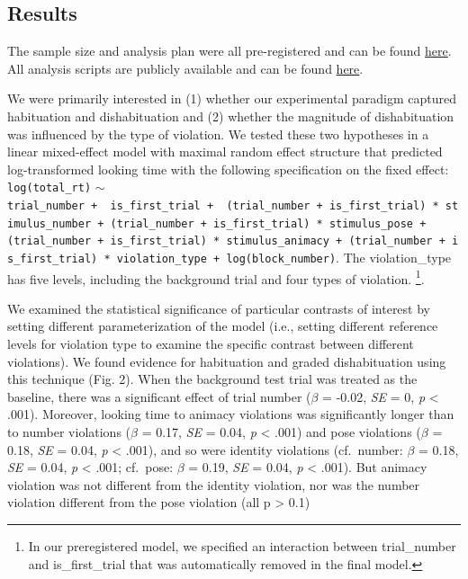 \documentclass[10pt, letterpaper]{article}
\begin{document}
\hypertarget{results}{%
\subsection{Results}\label{results}}

The sample size and analysis plan were all pre-registered and can be
found \href{https://aspredicted.org/blind.php?x=WGF_J7K}{here}. All
analysis scripts are publicly available and can be found
\href{https://anonymous.4open.science/r/pokebaby_cogsci2024-3636/README.md}{here}.

We were primarily interested in (1) whether our experimental paradigm
captured habituation and dishabituation and (2) whether the magnitude of
dishabituation was influenced by the type of violation. We tested these
two hypotheses in a linear mixed-effect model with maximal random effect
structure that predicted log-transformed looking time with the following
specification on the fixed effect: \texttt{log(total\_rt)} \(\sim\)
\texttt{trial\_number\ +\ \ is\_first\_trial\ +\ \ (trial\_number\ +\ is\_first\_trial)\ *\ stimulus\_number\ +\ (trial\_number\ +\ is\_first\_trial)\ *\ stimulus\_pose\ +(trial\_number\ +\ is\_first\_trial)\ *\ stimulus\_animacy\ +\ (trial\_number\ +\ is\_first\_trial)\ *\ violation\_type\ +\ log(block\_number)}.
The violation\_type has five levels, including the background trial and
four types of violation. \footnote{In our preregistered model, we
  specified an interaction between trial\_number and is\_first\_trial
  that was automatically removed in the final model.}.

We examined the statistical significance of particular contrasts of
interest by setting different parameterization of the model (i.e.,
setting different reference levels for violation type to examine the
specific contrast between different violations). We found evidence for
habituation and graded dishabituation using this technique (Fig. 2).
When the background test trial was treated as the baseline, there was a
significant effect of trial number (\(\beta\) = -0.02, \emph{SE} = 0,
\emph{p} \textless{} .001). Moreover, looking time to animacy violations
was significantly longer than to number violations (\(\beta\) = 0.17,
\emph{SE} = 0.04, \emph{p} \textless{} .001) and pose violations
(\(\beta\) = 0.18, \emph{SE} = 0.04, \emph{p} \textless{} .001), and so
were identity violations (cf.~number: \(\beta\) = 0.18, \emph{SE} =
0.04, \emph{p} \textless{} .001; cf.~pose: \(\beta\) = 0.19, \emph{SE} =
0.04, \emph{p} \textless{} .001). But animacy violation was not
different from the identity violation, nor was the number violation
different from the pose violation (all p \textgreater{} 0.1)
\end{document}

